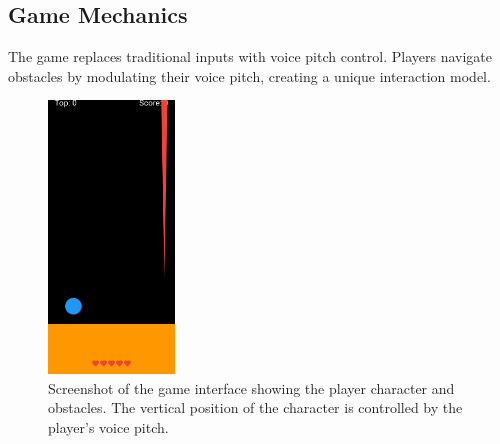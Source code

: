 \documentclass[runningheads]{llncs}
\begin{document}
\newpage
\subsection{Game Mechanics}
The game replaces traditional inputs with voice pitch control. Players navigate obstacles by modulating their voice pitch, creating a unique interaction model.  
\begin{figure}[h]
    \centering
    \includegraphics[width=0.3\textwidth]{figures/game_start.jpg}
    \caption{Screenshot of the game interface showing the player character and obstacles. The vertical position of the character is controlled by the player's voice pitch.}
    \label{fig:game_screenshot}
\end{figure}

\newpage
\end{document}
